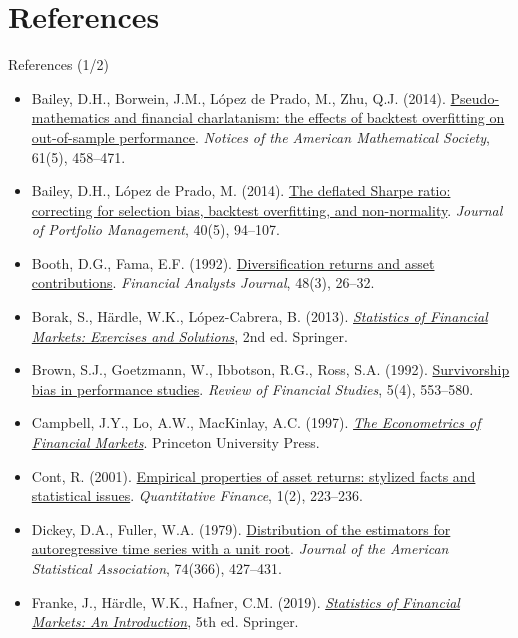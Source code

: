 \section{References}

\begin{frame}{References (1/2)}
\itemsize{\tiny}
\begin{itemize}
    \item Bailey, D.H., Borwein, J.M., López de Prado, M., Zhu, Q.J. (2014). \href{https://doi.org/10.1090/noti1105}{Pseudo-mathematics and financial charlatanism: the effects of backtest overfitting on out-of-sample performance}. \textit{Notices of the American Mathematical Society}, 61(5), 458--471.
    \item Bailey, D.H., López de Prado, M. (2014). \href{https://doi.org/10.3905/jpm.2014.40.5.094}{The deflated Sharpe ratio: correcting for selection bias, backtest overfitting, and non-normality}. \textit{Journal of Portfolio Management}, 40(5), 94--107.
    \item Booth, D.G., Fama, E.F. (1992). \href{https://doi.org/10.2469/faj.v48.n3.26}{Diversification returns and asset contributions}. \textit{Financial Analysts Journal}, 48(3), 26--32.
    \item Borak, S., Härdle, W.K., López-Cabrera, B. (2013). \href{https://doi.org/10.1007/978-3-642-33929-5}{\textit{Statistics of Financial Markets: Exercises and Solutions}}, 2nd ed. Springer.
    \item Brown, S.J., Goetzmann, W., Ibbotson, R.G., Ross, S.A. (1992). \href{https://doi.org/10.1093/rfs/5.4.553}{Survivorship bias in performance studies}. \textit{Review of Financial Studies}, 5(4), 553--580.
    \item Campbell, J.Y., Lo, A.W., MacKinlay, A.C. (1997). \href{https://doi.org/10.1515/9781400830213}{\textit{The Econometrics of Financial Markets}}. Princeton University Press.
    \item Cont, R. (2001). \href{https://doi.org/10.1080/713665670}{Empirical properties of asset returns: stylized facts and statistical issues}. \textit{Quantitative Finance}, 1(2), 223--236.
    \item Dickey, D.A., Fuller, W.A. (1979). \href{https://doi.org/10.1080/01621459.1979.10482531}{Distribution of the estimators for autoregressive time series with a unit root}. \textit{Journal of the American Statistical Association}, 74(366), 427--431.
    \item Franke, J., Härdle, W.K., Hafner, C.M. (2019). \href{https://doi.org/10.1007/978-3-030-13751-9}{\textit{Statistics of Financial Markets: An Introduction}}, 5th ed. Springer.
\end{itemize}
\end{frame}

